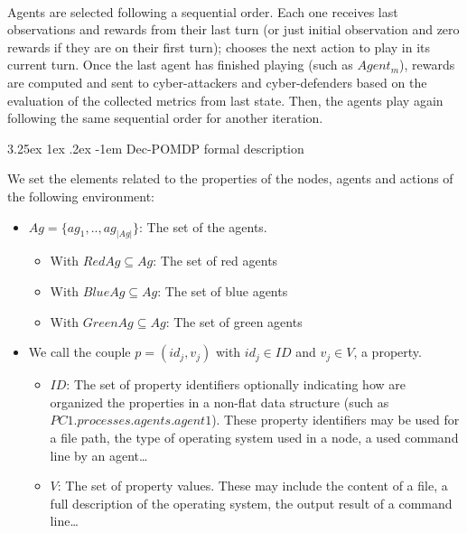 \documentclass[conference]{IEEEtran}
\makeatletter
\renewcommand\subparagraph{\@startsection{subparagraph}{6}{\parindent}%
  {3.25ex \@plus1ex \@minus .2ex}%
  {-1em}%
  {\normalfont\normalsize\bfseries}}
\makeatother
\begin{document}
\

Agents are selected following a sequential order. Each one receives last observations and rewards from their last turn (or just initial observation and zero rewards if they are on their first turn); chooses the next action to play in its current turn. Once the last agent has finished playing (such as $Agent_m$), rewards are computed and sent to cyber-attackers and cyber-defenders based on the evaluation of the collected metrics from last state. Then, the agents play again following the same sequential order for another iteration.


\subparagraph{Dec-POMDP formal description}

We set the elements related to the properties of the nodes, agents and actions of the following environment:

\begin{itemize}

    \item $Ag = \{ag_1,..,ag_{|Ag|}\}$: The set of the agents.
    \begin{itemize}
        \item With $RedAg \subseteq Ag$: The set of red agents
        \item With $BlueAg \subseteq Ag$: The set of blue agents
        \item With $GreenAg \subseteq Ag$: The set of green agents
    \end{itemize}

    \item We call the couple $p = (id_{j}, v_{j})$ with $id_j \in {ID}$ and $v_j \in V$, a property.
    \begin{itemize}
        \item $ID$: The set of property identifiers optionally indicating how are organized the properties in a non-flat data structure (such as $PC1.processes.agents.agent1$). These property identifiers may be used for a file path, the type of operating system used in a node, a used command line by an agent\dots
        \item $V$: The set of property values. These may include the content of a file, a full description of the operating system, the output result of a command line\dots
    \end{itemize}


\end{itemize}
\end{document}
